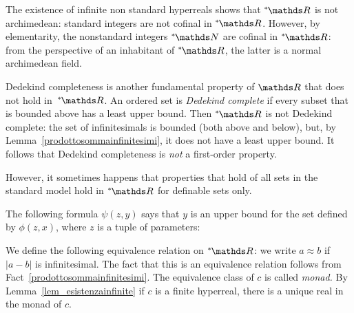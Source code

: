 The existence of infinite non standard hyperreals shows that $\nsR$ is not archimedean: standard integers are not cofinal in $\nsR$.
However, by elementarity, the nonstandard integers $\nsN$ are cofinal in $\nsR$: from the perspective of an inhabitant of $\nsR$, the latter is a normal archimedean field.


Dedekind completeness is another fundamental property of $\RR$ that does not hold in~$\nsR$.
An ordered set is \emph{Dedekind complete} if every subset that is bounded above has a least upper bound.
Then $\nsR$ is not Dedekind complete: the set of infinitesimals is bounded (both above and below), but, by Lemma~\ref{prodottosommainfinitesimi}, it does not have a least upper bound.
It follows that Dedekind completeness is \textit{not\/} a first-order property.

However, it sometimes happens that properties that hold of all sets in the standard model hold in $\nsR$ for definable sets only.

 

The following formula $\psi(z,y)$ says that $y$ is an upper bound for the set defined by $\phi(z,x)$, where $z$ is a tuple of parameters:






We define the following equivalence relation on $\nsR$: we write \emph{$a\approx b$\/} if $|a-b|$ is infinitesimal.
The fact that this is an equivalence relation follows from Fact~\ref{prodottosommainfinitesimi}.
The equivalence class of $c$ is called \emph{monad.}
By Lemma~\ref{lem_esistenzainfinite} if $c$ is a finite hyperreal, there is a unique real in the monad of $c$.

